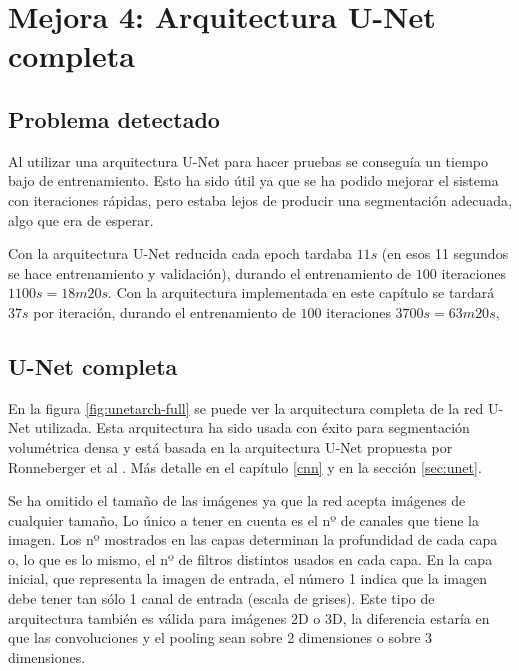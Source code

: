 \chapter{Mejora 4: Arquitectura U-Net completa}\label{full_unet}

\section{Problema detectado}\label{sec:full_unet_problem}

Al utilizar una arquitectura U-Net para hacer pruebas se conseguía un tiempo bajo de entrenamiento. Esto ha sido útil ya que se ha podido mejorar el sistema con iteraciones rápidas, pero estaba lejos de producir una segmentación adecuada, algo que era de esperar.

Con la arquitectura U-Net reducida cada epoch tardaba $11s$ (en esos 11 segundos se hace entrenamiento y validación), durando el entrenamiento de $100$ iteraciones $1100s = 18m20s$. Con la arquitectura implementada en este capítulo se tardará $37s$ por iteración, durando el entrenamiento de $100$ iteraciones $3700s = 63m20s$, 

\section{U-Net completa}\label{sec:full_unet_change}

En la figura \ref{fig:unetarch-full} se puede ver la arquitectura completa de la red U-Net utilizada. Esta arquitectura ha sido usada con éxito para segmentación volumétrica densa \cite{Cicek2016} y está basada en la arquitectura U-Net propuesta por Ronneberger et al \cite{Ronneberger2015}. Más detalle en el capítulo \ref{cnn} y en la sección \ref{sec:unet}.

Se ha omitido el tamaño de las imágenes ya que la red acepta imágenes de cualquier tamaño, Lo único a tener en cuenta es el nº de canales que tiene la imagen. Los nº mostrados en las capas determinan la profundidad de cada capa o, lo que es lo mismo, el nº de filtros distintos usados en cada capa. En la capa inicial, que representa la imagen de entrada, el número 1 indica que la imagen debe tener tan sólo 1 canal de entrada (escala de grises). Este tipo de arquitectura también es válida para imágenes 2D o 3D, la diferencia estaría en que las convoluciones y el pooling sean sobre 2 dimensiones o sobre 3 dimensiones.


